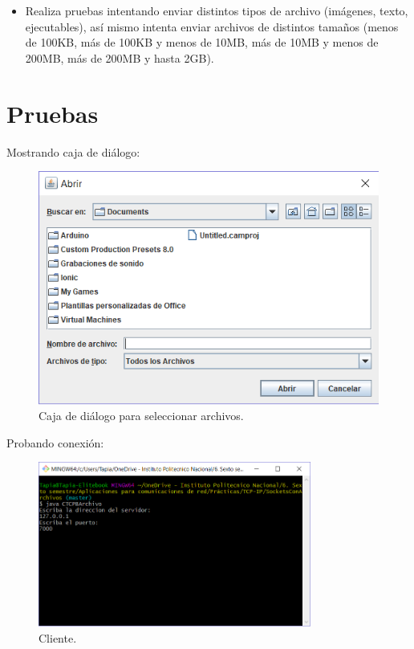 \documentclass[12pt,twoside]{article}
\begin{document}
\begin{itemize}
    \item Realiza pruebas intentando enviar distintos tipos de archivo (im\'agenes, texto, ejecutables), as\'i mismo intenta enviar archivos de distintos tamaños (menos de 100KB, m\'as de 100KB y menos de 10MB, m\'as de 10MB y
menos de 200MB, m\'as de 200MB y hasta 2GB).


\end{itemize}




\section{Pruebas}
Mostrando caja de di\'alogo:
\begin{figure}[h]
	\centering
	\includegraphics[width=1\textwidth]{img/JFChooser.png}
	\caption{Caja de di\'alogo para seleccionar archivos.}
\end{figure}

\newpage

Probando conexi\'on:
\begin{figure}[h]
	\centering
	\includegraphics[width=0.8\textwidth]{img/Cliente.png}
	\caption{Cliente.}
\end{figure}
\end{document}
